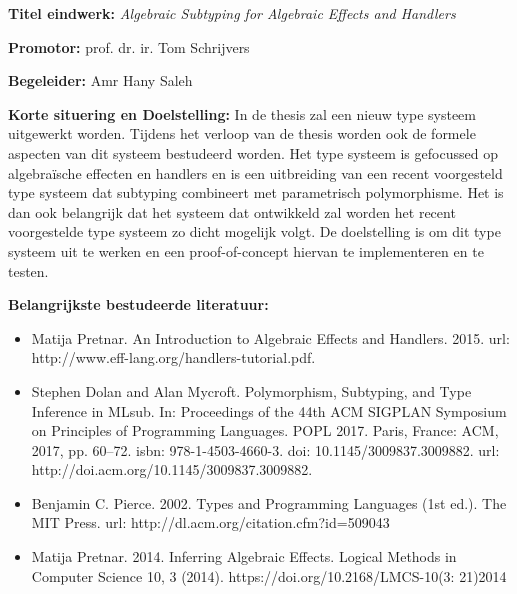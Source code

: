 \documentclass[12pt]{report}
\begin{document}
\pagestyle{myheadings}
{\bf Titel eindwerk:} {\em Algebraic Subtyping for Algebraic Effects and Handlers}

\vspace{0.5cm}
{\bf Promotor:} prof. dr. ir. Tom Schrijvers

\vspace{0.5cm}
{\bf Begeleider:} Amr Hany Saleh

\vspace{1cm}
{\bf Korte situering en Doelstelling:} In de thesis zal een nieuw type systeem uitgewerkt worden. Tijdens het verloop van de thesis worden ook de formele aspecten van dit systeem bestudeerd worden. Het type systeem is gefocussed op algebraïsche effecten en handlers en is een uitbreiding van een recent voorgesteld type systeem dat subtyping combineert met parametrisch polymorphisme. Het is dan ook belangrijk dat het systeem dat ontwikkeld zal worden het recent voorgestelde type systeem zo dicht mogelijk volgt. De doelstelling is om dit type systeem uit te werken en een proof-of-concept hiervan te implementeren en te testen.

\vspace{1cm}
{\bf Belangrijkste bestudeerde literatuur:}
\begin{itemize}
\item Matija Pretnar. An Introduction to Algebraic Effects and Handlers. 2015. url: http://www.eff-lang.org/handlers-tutorial.pdf.
\item Stephen Dolan and Alan Mycroft. Polymorphism, Subtyping, and Type Inference in MLsub. In: Proceedings of the 44th ACM SIGPLAN Symposium on Principles of Programming Languages. POPL 2017. Paris, France: ACM, 2017, pp. 60–72. isbn: 978-1-4503-4660-3. doi: 10.1145/3009837.3009882. url: http://doi.acm.org/10.1145/3009837.3009882.
\item Benjamin C. Pierce. 2002. Types and Programming Languages (1st ed.). The MIT Press. url: http://dl.acm.org/citation.cfm?id=509043
\item Matija Pretnar. 2014. Inferring Algebraic Effects. Logical Methods in Computer Science 10, 3 (2014). https://doi.org/10.2168/LMCS-10(3: 21)2014
\end{itemize}
\end{document}

